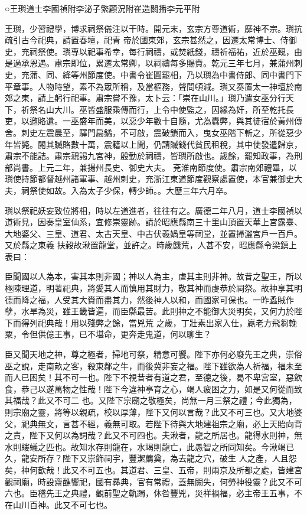 
\begin{pinyinscope}

 ○王璵道士李國禎附李泌子繁顧況附崔造關播李元平附



 王璵，少習禮學，博求祠祭儀注以干時。開元末，玄宗方尊道術，靡神不宗。璵抗疏引古今祀典，請置春壇，祀青
 帝於國東郊，玄宗甚然之，因遷太常博士、侍御史，充祠祭使。璵專以祀事希幸，每行祠禱，或焚紙錢，禱祈福祐，近於巫覡，由是過承恩遇。肅宗即位，累遷太常卿，以祠禱每多賜賚。乾元三年七月，兼蒲州刺史，充蒲、同、絳等州節度使。中書令崔圓罷相，乃以璵為中書侍郎、同中書門下平章事。人物時望，素不為眾所稱，及當樞務，聲問頓減。璵又奏置太一神壇於南郊之東，請上躬行祀事。肅宗嘗不豫，太卜云：「崇在山川。」璵乃遣女巫分行天
 下，祈祭名山大川。巫皆盛服乘傳而行，上令中使監之，因緣為奸，所至乾托長吏，以邀賂遺。一巫盛年而美，以惡少年數十自隨，尤為蠹弊，與其徒宿於黃州傳舍。刺史左震晨至，驛門扃鐍，不可啟，震破鎖而入，曳女巫階下斬之，所從惡少年皆斃。閱其贓賂數十萬，震籍以上聞，仍請贓錢代貧民租稅，其中使發遣歸京，肅宗不能詰。肅宗親謁九宮神，殷勤於祠禱，皆璵所啟也。歲餘，罷知政事，為刑部尚書。上元二年，兼揚州長史、御史大夫。
 兗淮南節度使。肅宗南郊禮畢，以璵使持節都督越州諸軍事、越州刺史，充浙江東道節度觀察處置使，本官兼御史大夫，祠祭使如故。入為太子少保，轉少師。。大歷三年六月卒。



 璵以祭祀妖妄致位將相，時以左道進者，往往有之。廣德二年八月，道士李國禎以道術見，因奏皇室仙系，宜修崇靈跡。請於昭應縣南三十里山頂置天華上宮露臺、大地婆父、三皇、道君、太古天皇、中古伏羲媧皇等祠堂，並置掃灑宮戶一百戶。又於縣之東義
 扶穀故湫置龍堂，並許之。時歲饑荒，人甚不安，昭應縣令梁鎮上表曰：



 臣聞國以人為本，害其本則非國；神以人為主，虐其主則非神。故昔之聖王，所以極陳理道，明著祀典，將愛其人而慎用其財力，敬其神而虔恭於祠祭。故神享其明德而降之福，人受其大賚而盡其力，然後神人以和，而國家可保也。一昨蟊賊作孽，水旱為災，雖王畿皆遍，而臣縣最苦。此則神之不能御大災明矣，又何力於陛下而得列祀典哉！用以殘弊之餘，當兇荒
 之歲，丁壯素出家入仕，羸老方飛芻輓粟，令但供億王事，已不堪命，更奔走鬼道，何以聊生？



 臣又聞天地之神，尊之極者，掃地可祭，精意可饗。陛下亦何必廢先王之典，崇俗巫之說，走南畝之客，殺東鄰之牛，而後冀非妄之福。陛下雖欲為人祈福，福未至而人已困矣！其不可一也。陛下不視昔者有道之君，至德之後，曷不卑宮室，惡飲食，恭己以遂萬物之性哉！陛下今違神亭育之心，竭人疲困之力，如是又何從而致其福哉？此又不可二
 也。又陛下宗廟之敬極矣，尚無一月三祭之禮；今此獨為，則宗廟之靈，將等以親疏，校以厚薄，陛下又何以言哉？此又不可三也。又大地婆父，祀典無文，言甚不經，義無可取。若陛下待與大地建祖宗之廟，必上天貽向背之責，陛下又何以為詞哉？此又不可四也。夫湫者，龍之所居也。龍得水則神，無水則螻蟻之匹也。故知水存則龍在，水竭則龍亡，此愚智之所同知矣。今湫竭已久，龍安所存？陛下又崇飾祠宇，豐潔薦奠，為去龍之穴，破生
 人之產，人且怨矣，神何歆哉！此又不可五也。其道君、三皇、五帝，則兩京及所都之處，皆建宮觀祠廟，時設齋醮饗祀，國有彞典，官有常禮，蓋無闕失，何勞神役靈？此又不可六也。臣稽先王之典禮，觀前聖之軌躅，休咎豐兇，災祥禍福，必主帝王五事，不在山川百神。此又不可七也。




\end{pinyinscope}
